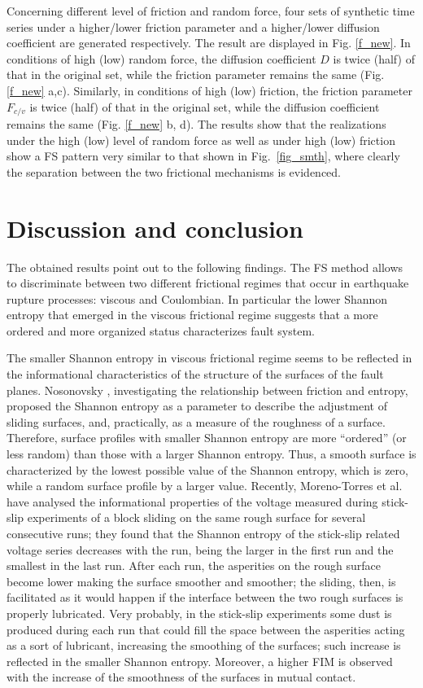 \documentclass[%
 aip,
rsi,%
 amsmath,amssymb,
 reprint,%
]{revtex4-1}
\begin{document}
Concerning different level of friction and random force, four sets of synthetic time series under a higher/lower friction parameter and a higher/lower diffusion coefficient are generated respectively.
The result are displayed in Fig. \ref{f_new}.
In conditions of high (low) random force, the diffusion coefficient $D$ is twice (half) of that in the original set, while the friction parameter remains the same (Fig. \ref{f_new} a,c).
Similarly, in conditions of high (low) friction, the friction parameter $F_{c/v}$ is twice (half) of that in the original set, while the diffusion coefficient remains the same (Fig. \ref{f_new} b, d). The results show that the realizations under the high (low) level of random force as well as under high (low) friction show a FS pattern very similar to that shown in Fig.~\ref{fig_smth}, where clearly the separation between the two frictional mechanisms is evidenced.


\section{Discussion and conclusion}
The obtained results point out to the following findings. The FS method allows to discriminate between two different frictional regimes that occur in earthquake rupture processes: viscous and Coulombian. In particular the lower Shannon entropy that emerged in the viscous frictional regime suggests that a more ordered and more organized status characterizes fault system.

The smaller Shannon entropy in viscous frictional regime seems to be reflected in the informational characteristics of the structure of the surfaces of the fault planes. Nosonovsky \cite{nosonovsky_entropy_2010}, investigating the relationship between friction and entropy, proposed the Shannon entropy as a parameter to describe the adjustment of sliding surfaces, and, practically, as a measure of the roughness of a surface. Therefore, surface profiles with smaller Shannon entropy are  more “ordered” (or less random) than those with a larger Shannon entropy. Thus, a smooth surface is characterized by the lowest possible value of the Shannon entropy, which is zero, while a random surface profile by a larger value. Recently, Moreno-Torres et al. \cite{moreno-torres_investigating_2018} have analysed the informational properties of the voltage measured during stick-slip experiments of a block sliding on the same rough surface for several consecutive runs; they found that the Shannon entropy of the stick-slip related voltage series decreases with the run, being the larger in the first run and the smallest in the last run. After each run, the asperities on the rough surface become lower making the surface smoother and smoother; the sliding, then, is facilitated as it would happen if the interface between the two rough surfaces is properly lubricated. Very probably, in the stick-slip experiments some dust is produced during each run that could fill the space between the asperities acting as a sort of lubricant, increasing the smoothing of the surfaces; such increase is reflected in the smaller Shannon entropy. Moreover, a higher FIM is observed with the increase of the smoothness of the surfaces in mutual contact.
\end{document}
